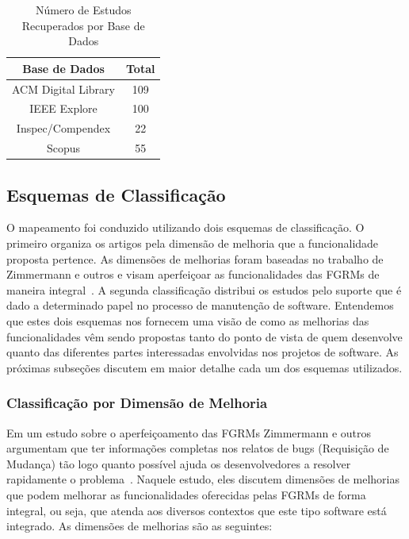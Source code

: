 \begin{table}[htb] \centering \caption{Número de Estudos Recuperados por Base de
		Dados}\label{tab:estudos-por-base-dados} \begin{tabular}{cc} \hline
		\textbf{Base de Dados} & \textbf{Total} \\ \hline ACM Digital Library
		& 109            \\ IEEE Explore           & 100            \\
		Inspec/Compendex       & 22             \\ Scopus                 & 55
		\\ \hline \end{tabular}

\end{table}

\subsection{Esquemas de Classificação}
\label{subsec:map-esquemas-classificacao}

O mapeamento foi conduzido utilizando dois esquemas de classificação. O primeiro
organiza os artigos pela dimensão de melhoria que a funcionalidade proposta
pertence. As dimensões de melhorias foram baseadas no trabalho de Zimmermann e
outros e visam aperfeiçoar as funcionalidades das FGRMs de maneira
integral~\cite{zimmermann2009improving}. A segunda classificação distribui os
estudos pelo suporte que é dado a determinado papel no processo de manutenção de
software. Entendemos que estes dois esquemas nos fornecem uma visão de como as
melhorias das funcionalidades vêm sendo propostas tanto do ponto de vista de
quem desenvolve quanto das diferentes partes interessadas envolvidas nos
projetos de software. As pró\-xi\-mas subseções discutem em maior detalhe cada
um dos esquemas utilizados.

\subsubsection{Classificação por Dimensão de Melhoria}
\label{subsubsec:map-esquema-suporte-problema}

Em um estudo sobre o aperfeiçoamento das FGRMs Zimmermann e outros argumentam
que ter informações completas nos relatos de bugs (Requisição de Mudança) tão
logo quanto possível ajuda os desenvolvedores a resolver rapidamente o
problema~\cite{zimmermann2009improving}. Naquele estudo, eles discutem dimensões
de melhorias que podem melhorar as funcionalidades oferecidas pelas FGRMs de
forma integral, ou seja, que atenda aos diversos contextos que este tipo
software está integrado. As dimensões de melhorias são as seguintes:

